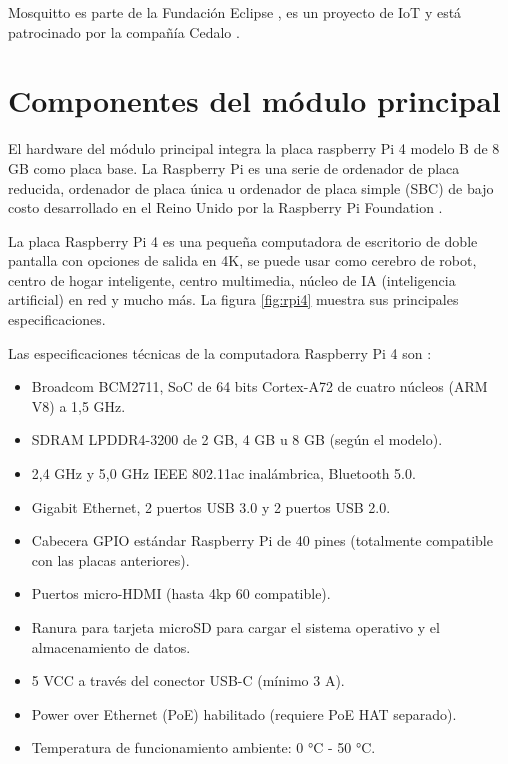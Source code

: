 
Mosquitto es parte de la Fundación Eclipse \citep{WEBSITE:5}, es un proyecto de IoT \citep{WEBSITE:39} y está patrocinado por la compañía Cedalo \citep{WEBSITE:40}. 


\section{Componentes del módulo principal} 

El hardware del módulo principal integra la placa raspberry Pi 4 modelo B de 8 GB como placa base. La Raspberry Pi es una serie de ordenador de placa reducida, ordenador de placa única u ordenador de placa simple (SBC) de bajo costo desarrollado en el Reino Unido por la Raspberry Pi Foundation \citep{WEBSITE:6}.

La placa Raspberry Pi 4 es una pequeña computadora de escritorio de doble pantalla con opciones de salida en 4K, se puede usar como cerebro de robot, centro de hogar inteligente, centro multimedia, núcleo de IA (inteligencia artificial) en red y mucho más. La figura \ref{fig:rpi4} muestra sus principales especificaciones.

Las especificaciones técnicas de la computadora Raspberry Pi 4 son \citep{WEBSITE:7}:

\begin{itemize}
\item Broadcom BCM2711, SoC de 64 bits Cortex-A72 de cuatro núcleos (ARM V8) a 1,5 GHz.
\item SDRAM LPDDR4-3200 de 2 GB, 4 GB u 8 GB (según el modelo).
\item 2,4 GHz y 5,0 GHz IEEE 802.11ac inalámbrica, Bluetooth 5.0.
\item Gigabit Ethernet, 2 puertos USB 3.0 y 2 puertos USB 2.0.
\item Cabecera GPIO estándar Raspberry Pi de 40 pines (totalmente compatible con las placas anteriores).
\item Puertos micro-HDMI (hasta 4kp 60 compatible).
\item Ranura para tarjeta microSD para cargar el sistema operativo y el almacenamiento de datos.
\item 5 VCC a través del conector USB-C (mínimo 3 A).
\vspace{0.5cm}
\item Power over Ethernet (PoE) habilitado (requiere PoE HAT separado).
\item Temperatura de funcionamiento ambiente: 0 °C - 50 °C.
\end{itemize}


